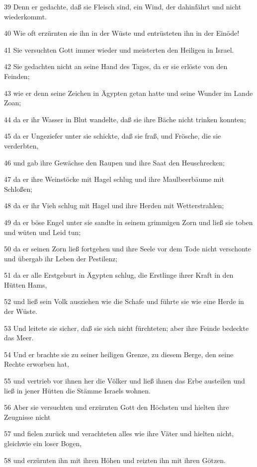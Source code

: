 \par 39 Denn er gedachte, daß sie Fleisch sind, ein Wind, der dahinfährt und nicht wiederkommt.
\par 40 Wie oft erzürnten sie ihn in der Wüste und entrüsteten ihn in der Einöde!
\par 41 Sie versuchten Gott immer wieder und meisterten den Heiligen in Israel.
\par 42 Sie gedachten nicht an seine Hand des Tages, da er sie erlöste von den Feinden;
\par 43 wie er denn seine Zeichen in Ägypten getan hatte und seine Wunder im Lande Zoan;
\par 44 da er ihr Wasser in Blut wandelte, daß sie ihre Bäche nicht trinken konnten;
\par 45 da er Ungeziefer unter sie schickte, daß sie fraß, und Frösche, die sie verderbten,
\par 46 und gab ihre Gewächse den Raupen und ihre Saat den Heuschrecken;
\par 47 da er ihre Weinstöcke mit Hagel schlug und ihre Maulbeerbäume mit Schloßen;
\par 48 da er ihr Vieh schlug mit Hagel und ihre Herden mit Wetterstrahlen;
\par 49 da er böse Engel unter sie sandte in seinem grimmigen Zorn und ließ sie toben und wüten und Leid tun;
\par 50 da er seinen Zorn ließ fortgehen und ihre Seele vor dem Tode nicht verschonte und übergab ihr Leben der Pestilenz;
\par 51 da er alle Erstgeburt in Ägypten schlug, die Erstlinge ihrer Kraft in den Hütten Hams,
\par 52 und ließ sein Volk ausziehen wie die Schafe und führte sie wie eine Herde in der Wüste.
\par 53 Und leitete sie sicher, daß sie sich nicht fürchteten; aber ihre Feinde bedeckte das Meer.
\par 54 Und er brachte sie zu seiner heiligen Grenze, zu diesem Berge, den seine Rechte erworben hat,
\par 55 und vertrieb vor ihnen her die Völker und ließ ihnen das Erbe austeilen und ließ in jener Hütten die Stämme Israels wohnen.
\par 56 Aber sie versuchten und erzürnten Gott den Höchsten und hielten ihre Zeugnisse nicht
\par 57 und fielen zurück und verachteten alles wie ihre Väter und hielten nicht, gleichwie ein loser Bogen,
\par 58 und erzürnten ihn mit ihren Höhen und reizten ihn mit ihren Götzen.
